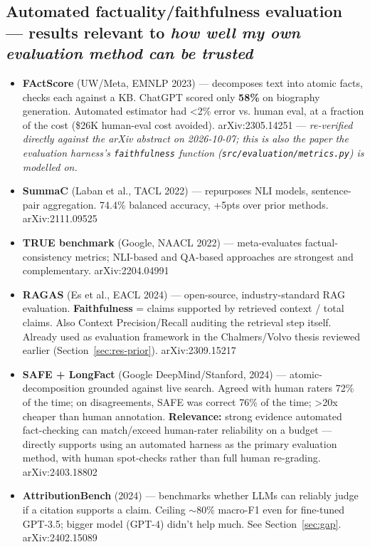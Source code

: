 \subsection{Automated factuality/faithfulness evaluation — results relevant to \textit{how well my own evaluation method can be trusted}}\label{sec:res-factuality}

\begin{itemize}
\item \textbf{FActScore} (UW/Meta, EMNLP 2023) — decomposes text into atomic facts, checks each against a KB. ChatGPT scored only \textbf{58\%} on biography generation. Automated estimator had <2\% error vs. human eval, at a fraction of the cost (\$26K human-eval cost avoided). arXiv:2305.14251 — \textit{re-verified directly against the arXiv abstract on 2026-10-07; this is also the paper the evaluation harness's \texttt{faithfulness} function (\texttt{src/evaluation/metrics.py}) is modelled on.}
\item \textbf{SummaC} (Laban et al., TACL 2022) — repurposes NLI models, sentence-pair aggregation. 74.4\% balanced accuracy, +5pts over prior methods. arXiv:2111.09525
\item \textbf{TRUE benchmark} (Google, NAACL 2022) — meta-evaluates factual-consistency metrics; NLI-based and QA-based approaches are strongest and complementary. arXiv:2204.04991
\item \textbf{RAGAS} (Es et al., EACL 2024) — open-source, industry-standard RAG evaluation. \textbf{Faithfulness} = claims supported by retrieved context / total claims. Also Context Precision/Recall auditing the retrieval step itself. Already used as evaluation framework in the Chalmers/Volvo thesis reviewed earlier (Section~\ref{sec:res-prior}). arXiv:2309.15217
\item \textbf{SAFE + LongFact} (Google DeepMind/Stanford, 2024) — atomic-decomposition grounded against live search. Agreed with human raters 72\% of the time; on disagreements, SAFE was correct 76\% of the time; >20x cheaper than human annotation. \textbf{Relevance:} strong evidence automated fact-checking can match/exceed human-rater reliability on a budget — directly supports using an automated harness as the primary evaluation method, with human spot-checks rather than full human re-grading. arXiv:2403.18802
\item \textbf{AttributionBench} (2024) — benchmarks whether LLMs can reliably judge if a citation supports a claim. Ceiling $\sim$80\% macro-F1 even for fine-tuned GPT-3.5; bigger model (GPT-4) didn't help much. See Section~\ref{sec:gap}. arXiv:2402.15089
\end{itemize}

